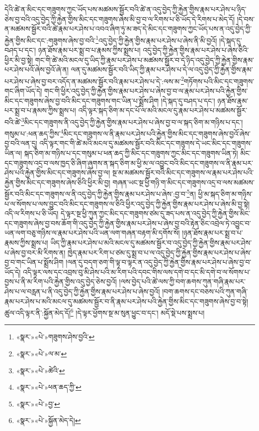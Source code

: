 དེའི་ཚེ་ན་མིང་དང་གཟུགས་ཀྱང་ཡོད་པས་མཚམས་སྦྱོར་བའི་ཚེ་ན་འདུ་བྱེད་ཀྱི་རྐྱེན་གྱིས་རྣམ་པར་ཤེས་པ་ཉིད་ཅེས་བྱ་བའི་འདུ་བྱེད་ཀྱི་རྐྱེན་གྱིས་མིང་དང་གཟུགས་ཞེས་མི་བྱ་བ་ལ་རིགས་པ་ཅི་ཡོད་དེ་རིགས་པ་མེད་དོ། །དེ་བས་ན་མཚམས་སྦྱོར་བའི་ཚེ་རྣམ་པར་ཤེས་པ་འབའ་ཞིག་ཏུ་མ་ཟད་དེ་མིང་དང་གཟུགས་ཀྱང་ཡོད་པས་ན་འདུ་བྱེད་ཀྱི་རྐྱེན་གྱིས་མིང་དང་:གཟུགས་ཞེས་བྱ་བའི་\footnote{«སྣར་»«པེ་»གཟུགས་ཤེས་བྱའི་}འདུ་བྱེད་ཀྱི་རྐྱེན་གྱིས་རྣམ་པར་ཤེས་པ་ཞེས་ནི་མི་བྱའོ། །དེ་སྐད་དུ་བཤད་པ་དང་། ཉན་ཐོས་རྣམ་པར་སྨྲ་བ་པ་རྣམས་ཀྱིས་སྨྲས་པ། འདུ་བྱེད་ཀྱི་རྐྱེན་གྱིས་རྣམ་པར་ཤེས་པ་ཞེས་ཅིའི་ཕྱིར་མི་བྱ་སྟེ། གང་གི་ཚེ་མའི་མངལ་དུ་ཡིད་ཀྱི་རྣམ་པར་ཤེས་པ་མཚམས་སྦྱོར་བ་དེ་ཉིད་འདུ་བྱེད་ཀྱི་རྐྱེན་གྱིས་རྣམ་པར་ཤེས་པའོ་ཞེས་བྱའོ་ཞེ་ན། ལན་དུ་མཚམས་སྦྱོར་བའི་ཡིད་ཀྱི་རྣམ་པར་ཤེས་པ་དེ་ལ་འདུ་བྱེད་ཀྱི་རྐྱེན་གྱིས་རྣམ་པར་ཤེས་པ་ཞེས་བྱ་བར་འདོད་ན་མཚམས་སྦྱོར་བའི་རྣམ་པར་ཤེས་པ་དེ་:ལས་མ་\footnote{«སྣར་»«པེ་»ལ་མ་}གཏོགས་པའི་མིང་དང་གཟུགས་གང་ཞིག་ཡོད་དེ། གང་གི་ཕྱིར་འདུ་བྱེད་ཀྱི་རྐྱེན་གྱིས་རྣམ་པར་ཤེས་པ་ཞེས་བྱ་བ་ལ་རྣམ་པར་ཤེས་པའི་རྐྱེན་གྱིས་མིང་དང་གཟུགས་ཞེས་བྱ་བའི་མིང་དང་གཟུགས་གང་ཡིན་པ་སྨྲོས་ཤིག །དེ་སྐད་དུ་བཤད་པ་དང་། ཉན་ཐོས་རྣམ་པར་སྨྲ་བ་པ་རྣམས་ཀྱིས་སྨྲས་པ། འདི་ལྟར་སྐད་ཅིག་མ་དང་པོ་ལ་མའི་མངལ་དུ་རྣམ་པར་ཤེས་པ་མཚམས་སྦྱོར་བའི་ཚེ་\footnote{«སྣར་»«པེ་»ཚེའི་}མིང་དང་གཟུགས་ནི་འདུ་བྱེད་ཀྱི་རྐྱེན་གྱིས་རྣམ་པར་ཤེས་པ་ཞེས་བྱ་བ་ལ་སྐད་ཅིག་མ་གཉིས་པ་དང་། གསུམ་པ་:ཕན་ཆད་ཀྱིས་\footnote{«སྣར་»«པེ་»ཕན་ཆད་ཀྱི་}མིང་དང་གཟུགས་ལ་ནི་རྣམ་པར་ཤེས་པའི་རྐྱེན་གྱིས་མིང་དང་གཟུགས་ཞེས་བྱའོ་ཞེས་བྱ་བའི་ལན་དུ། འདི་ལྟར་གང་གི་ཚེ་མའི་མངལ་དུ་མཚམས་སྦྱོར་བའི་མིང་དང་གཟུགས་དེ་ཡང་མིང་དང་གཟུགས་ཡིན་ལ། སྐད་ཅིག་མ་གཉིས་པ་དང་གསུམ་པ་ཕན་ཆད་ཀྱི་མིང་དང་གཟུགས་ཀྱང་མིང་དང་གཟུགས་ཡིན་ཏེ། མིང་དང་གཟུགས་འདྲ་བ་ལས་ཁྱད་ཅི་ཞིག་ཞུགས་ན་སྐད་ཅིག་མ་ཕྱི་མ་ལ་འབྱུང་བའི་མིང་དང་གཟུགས་ལ་ནི་རྣམ་པར་ཤེས་པའི་རྐྱེན་གྱིས་མིང་དང་གཟུགས་ཞེས་བྱ་ལ། སྔ་མ་མཚམས་སྦྱོར་བའི་མིང་དང་གཟུགས་ལ་རྣམ་པར་ཤེས་པའི་རྐྱེན་གྱིས་མིང་དང་གཟུགས་ཞེས་ཅིའི་ཕྱིར་མི་བྱ། གཞན་ཡང་སྔ་ཕྱི་གཉི་ག་མིང་དང་གཟུགས་འདྲ་བ་ལས་མཚམས་སྦྱོར་བའི་མིང་དང་གཟུགས་ལ་ནི་འདུ་བྱེད་ཀྱི་རྐྱེན་གྱིས་རྣམ་པར་ཤེས་པ་ཞེས་:བྱ་བ་\footnote{«སྣར་»«པེ་»བྱ་}ན། ཕྱི་མ་སྐད་ཅིག་མ་གཉིས་པ་ལ་སོགས་པ་ལས་བྱུང་བའི་མིང་དང་གཟུགས་ལ་ཅིའི་ཕྱིར་འདུ་བྱེད་ཀྱི་རྐྱེན་གྱིས་རྣམ་པར་ཤེས་པ་ཞེས་མི་བྱ་སྟེ། འདི་ལ་རིགས་པ་ཅི་ཡོད། དེ་ལྟར་སྔ་ཕྱི་ཀུན་ཀྱང་མིང་དང་གཟུགས་ཙམ་དུ་ཟད་པས་ན་འདུ་བྱེད་ཀྱི་རྐྱེན་གྱིས་མིང་དང་གཟུགས་ཞེས་བྱ་བས་ཆོག་གི་འདུ་བྱེད་ཀྱི་རྐྱེན་གྱིས་རྣམ་པར་ཤེས་པ་ཞེས་བྱ་བའི་རྟེན་ཅིང་འབྲེལ་ཏེ་འབྱུང་བ་ཡན་ལག་བཅུ་གཉིས་ལ་རྣམ་པར་ཤེས་པའི་ཡན་ལག་གཞན་བརྟག་མི་དགོས་སོ། །ཉན་ཐོས་རྣམ་པར་སྨྲ་བ་པ་རྣམས་ཀྱིས་སྨྲས་པ། ཡིད་ཀྱི་རྣམ་པར་ཤེས་པ་མའི་མངལ་དུ་མཚམས་སྦྱོར་བ་འདུ་བྱེད་ཀྱི་རྐྱེན་གྱིས་རྣམ་པར་ཤེས་པ་ཞེས་བྱ་བར་མི་རིགས་ན། ཁྱེད་རྣམ་པར་རིག་པ་ཙམ་དུ་སྨྲ་བ་པ་ལ་འདུ་བྱེད་ཀྱི་རྐྱེན་གྱིས་རྣམ་པར་ཤེས་པ་ཞེས་བྱ་བ་གང་ཡིན་པ་སྨྲོས་ཤིག །ལན་དུ་བདག་ཅག་གི་ལྟ་བ་ལྟར་ན་འདུ་བྱེད་ཀྱི་རྐྱེན་གྱིས་རྣམ་པར་ཤེས་པ་ཞེས་བྱ་བ་ཡོད་དེ། འདི་ལྟར་ལས་དང་འབྲས་བུ་མི་ཤེས་པའི་མ་རིག་པའི་དབང་གིས་ལས་དགེ་བ་དང་མི་དགེ་བ་ལ་སོགས་པ་བྱས་པ་ནི་མ་རིག་པའི་རྐྱེན་གྱིས་འདུ་བྱེད་ཅེས་བྱའོ། །ལས་བྱེད་པའི་ཚེ་ལས་ཀྱི་བག་ཆགས་ཀུན་གཞི་རྣམ་པར་ཤེས་པ་ལ་བརླན་པ་ནི་འདུ་བྱེད་ཀྱི་རྐྱེན་གྱིས་རྣམ་པར་ཤེས་པ་ཞེས་བྱའོ། །བག་ཆགས་དང་བཅས་པའི་ཀུན་གཞི་རྣམ་པར་ཤེས་པ་མའི་མངལ་དུ་མཚམས་སྦྱོར་བ་ནི་རྣམ་པར་ཤེས་པའི་རྐྱེན་གྱིས་མིང་དང་གཟུགས་ཞེས་བྱ་བ་སྟེ། ཚུལ་འདི་ལྟར་ནི་:སྐྱོན་མེད་དོ།\footnote{«སྣར་»«པེ་»སྐྱོན་མེད་དེ།} །དེ་ལྟར་ཕྱོགས་སྔ་མ་སུན་ཕྱུང་བ་དང་། མདོ་སྡེ་པས་སྨྲས་པ། 